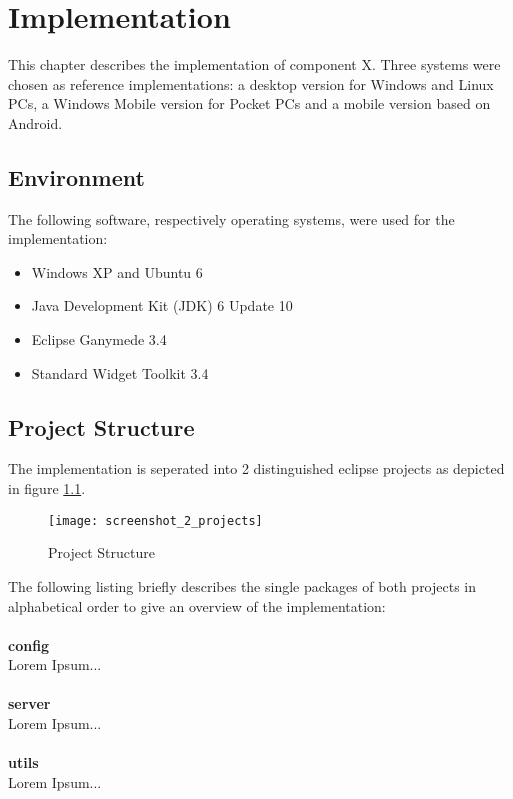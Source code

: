 \chapter{Implementation\label{cha:chapter5}}

This chapter describes the implementation of component X. Three systems were chosen as reference implementations: a desktop version for Windows and Linux PCs, a Windows Mobile version for Pocket PCs and a mobile version based on Android. 

\section{Environment\label{sec:env}}
The following software, respectively operating systems, were used for the implementation:

\begin{itemize}
		\item Windows XP and Ubuntu 6
		\vspace{-0.1in} 
		\item Java Development Kit (JDK) 6 Update 10 
		\vspace{-0.1in} 
		\item Eclipse Ganymede 3.4
		\vspace{-0.1in} 
		\item Standard Widget Toolkit 3.4
\end{itemize}

\section{Project Structure\label{sec:projectstructure}}

The implementation is seperated into 2 distinguished eclipse projects as depicted in figure \ref{fig:projects}.

\begin{figure}[htb]
  \centering
  \texttt{[image: screenshot\_2\_projects]}
  \caption{Project Structure}
  \label{fig:projects}
\end{figure}

\noindent
The following listing briefly describes the single packages of both projects in alphabetical order to give an overview of the implementation:
\\
\\
\textbf{config} 
\\
Lorem Ipsum...
\\
\\
\textbf{server} 
\\
Lorem Ipsum...
\\
\\
\textbf{utils} 
\\
Lorem Ipsum...

